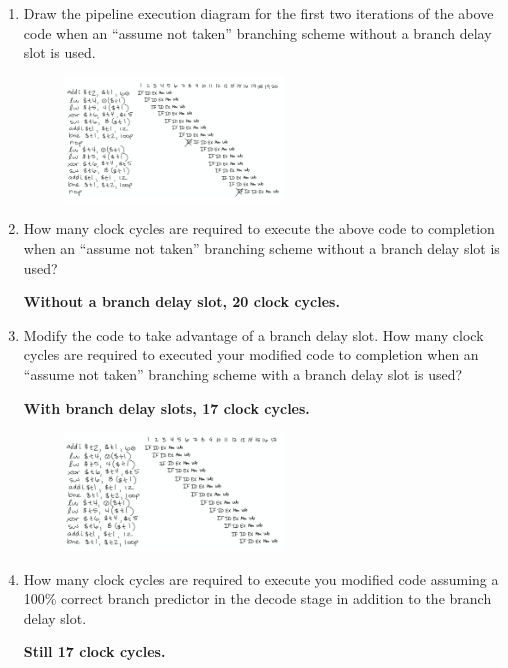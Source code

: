 \documentclass{article}
\begin{document}
\begin{enumerate}
\begin{enumerate}
    \item Draw the pipeline execution diagram for the first two iterations of the above code when an “assume not taken” branching scheme without a branch delay slot is used.\par
        \begin{figure}[h!]
        \centering
        \includegraphics[width=0.55\textwidth]{q1-c.png}
        \end{figure}
    \item How many clock cycles are required to execute the above code to completion when an “assume not taken” branching scheme without a branch delay slot is used?\par
    \textbf{Without a branch delay slot, 20 clock cycles.}
    \item Modify the code to take advantage of a branch delay slot. How many clock cycles are required to executed your modified code to completion when an “assume not taken” branching scheme with a branch delay slot is used?\par
    \textbf{With branch delay slots, 17 clock cycles.}
        \begin{figure}[h!]
        \centering
        \includegraphics[width=0.55\textwidth]{q1-d.png}
        \end{figure}
    \item How many clock cycles are required to execute you modified code assuming a 100\% correct branch predictor in the decode stage in addition to the branch delay slot.\par
    \textbf{Still 17 clock cycles.}
        \begin{figure}[h!]

\end{figure}
\end{enumerate}
\end{enumerate}
\end{document}
